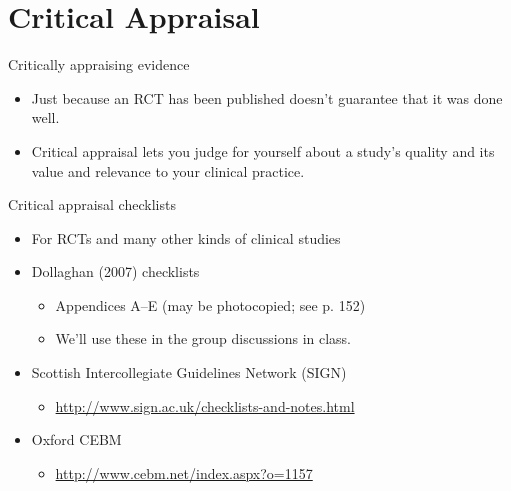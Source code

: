 \documentclass{beamer}
\begin{document}
\section*{Critical Appraisal}

%
\begin{frame}
\center{\Huge{\textcolor{darkgray}{Critical Appraisal}}}
\end{frame}

% 
\begin{frame}{Critically appraising evidence}
	\begin{itemize}
	\item Just because an RCT has been published doesn't guarantee that it was done well.
	\item Critical appraisal lets you judge for yourself about a study's quality and its value and relevance to your clinical practice.
	\end {itemize}
\end{frame}

% 
\begin{frame}{Critical appraisal checklists}
	\begin{itemize}
	\item For RCTs and many other kinds of clinical studies
	\item Dollaghan (2007) checklists
		\begin{itemize}
		\item Appendices A--E (may be photocopied; see p. 152)
		\item We'll use these in the group discussions in class.
		\end{itemize}
	\item Scottish Intercollegiate Guidelines Network (SIGN)
		\begin{itemize}
		\item \url{http://www.sign.ac.uk/checklists-and-notes.html}
		\end{itemize} 
	\item Oxford CEBM
		\begin{itemize}
		\item \url{http://www.cebm.net/index.aspx?o=1157}
		\end{itemize} 	
	\end{itemize}
\end{frame}

\end{document}

